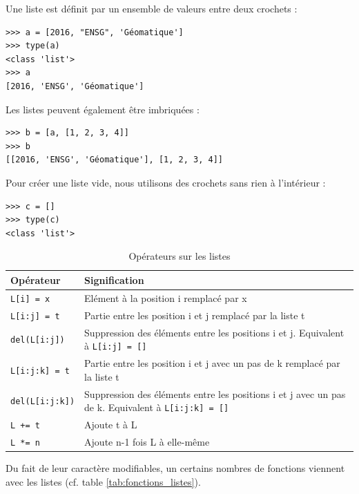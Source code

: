 \documentclass[12pt, a4paper]{article}
\begin{document}
Une liste est définit par un ensemble de valeurs entre deux crochets :
\begin{lstlisting}
>>> a = [2016, "ENSG", 'Géomatique']
>>> type(a)
<class 'list'>
>>> a
[2016, 'ENSG', 'Géomatique']
\end{lstlisting}

Les listes peuvent également être imbriquées :
\begin{lstlisting}
>>> b = [a, [1, 2, 3, 4]]
>>> b
[[2016, 'ENSG', 'Géomatique'], [1, 2, 3, 4]]
\end{lstlisting}

Pour créer une liste vide, nous utilisons des crochets sans rien à l'intérieur :
\begin{lstlisting}
>>> c = []
>>> type(c)
<class 'list'>
\end{lstlisting}

\begin{table}[H]
	\begin{center}
		\begin{tabular}{|l|p{11cm}|}
			\hline
			\textbf{Opérateur} & \textbf{Signification} \\
			\hline
			\lstinline{L[i] = x} & Elément à la position i remplacé par x \\
			\lstinline{L[i:j] = t} & Partie entre les position i et j remplacé par la liste t \\
			\lstinline{del(L[i:j])} & Suppression des éléments entre les positions i et j. Equivalent à \lstinline{L[i:j] = []} \\
			\lstinline{L[i:j:k] = t} & Partie entre les position i et j avec un pas de k remplacé par la liste t \\
			\lstinline{del(L[i:j:k])} & Suppression des éléments entre les positions i et j avec un pas de k. Equivalent à \lstinline{L[i:j:k] = []} \\
			\lstinline{L += t} & Ajoute t à L \\
			\lstinline{L *= n}  & Ajoute n-1 fois L à elle-même \\
			\hline
		\end{tabular}
		\caption{Opérateurs sur les listes}
		\label{tab:operateurs_listes}
	\end{center}
\end{table}

Du fait de leur caractère modifiables, un certains nombres de fonctions viennent avec les listes (cf. table \ref{tab:fonctions_listes}).
\end{document}
